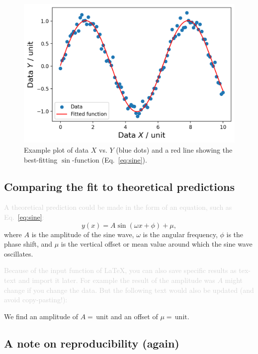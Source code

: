 \documentclass[fleqn,usenatbib]{mnras}
\newcommand{\comment}[1]{\textcolor{lightgray}{#1}}
\begin{document}
\begin{figure}
    \centering
    \includegraphics[width=\columnwidth]{figures/sin_fit_x_y.png}
    \caption{Example plot of data $X$ vs. $Y$ (blue dots) and a red line showing the best-fitting $\sin$-function (Eq.~\ref{eq:sine}).}
    \label{fig:sin_fit_x_y}
\end{figure}

\subsection{Comparing the fit to theoretical predictions} \label{sec:analysis_comparison}

\comment{A theoretical prediction could be made in the form of an equation, such as Eq.~\ref{eq:sine}:}
\begin{equation}
    y(x) = A \sin(\omega x + \phi) + \mu, \label{eq:sine}
\end{equation}
where $A$ is the amplitude of the sine wave, $\omega$ is the angular frequency, $\phi$ is the phase shift, and $\mu$ is the vertical offset or mean value around which the sine wave oscillates.

\comment{Because of the input function of \LaTeX, you can also save specific results as tex-text and import it later. For example the result of the amplitude was $A$ might change if you change the data. But the following text would also be updated (and avoid copy-pasting!):}

We find an amplitude of $A = \,\mathrm{unit}$ and an offset of $\mu = \,\mathrm{unit}$.

\subsection{A note on reproducibility (again)}\label{sec:analysis_reproducibility}
\end{document}
